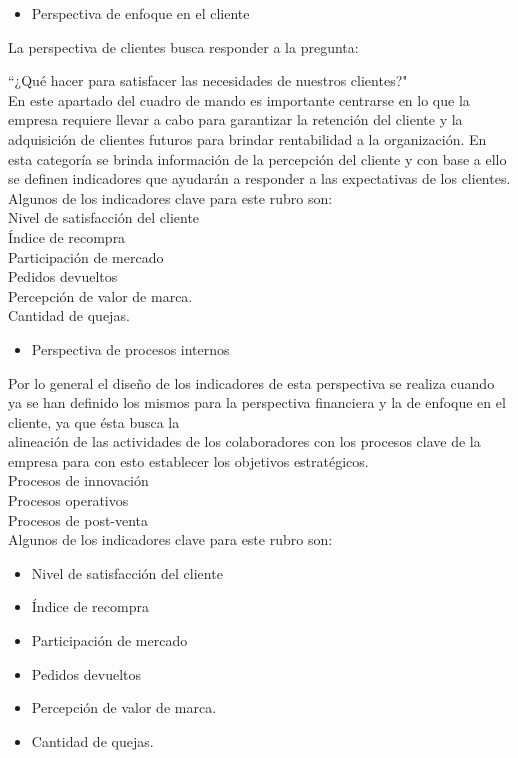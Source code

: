\documentclass[%
 reprint,
 amsmath,amssymb,
 aps,
]{revtex4-1}
\begin{document}
\begin{itemize}
\item Perspectiva de enfoque en el cliente
\end{itemize}

La perspectiva de clientes busca responder a la pregunta:

“¿Qué hacer para satisfacer las necesidades de nuestros clientes?"\\

En este apartado del cuadro de mando es importante centrarse en lo que la empresa requiere llevar a cabo para garantizar la retención del cliente y la adquisición de clientes futuros para brindar rentabilidad a la organización. En esta categoría se brinda información de la percepción del cliente y con base a ello se definen indicadores que ayudarán a responder a las expectativas de los clientes.\\

Algunos de los indicadores clave para este rubro son:\\

 Nivel de satisfacción del cliente\\
 Índice de recompra\\
 Participación de mercado\\
 Pedidos devueltos\\
 Percepción de valor de marca.\\
 Cantidad de quejas.\\
\begin{itemize}
\item Perspectiva de procesos internos
\end{itemize}
Por lo general el diseño de los indicadores de esta perspectiva se realiza cuando ya se han definido los mismos para la perspectiva financiera y la de enfoque en el cliente, ya que ésta busca la\\ alineación de las actividades de los colaboradores con los procesos clave de la empresa para con esto establecer los objetivos estratégicos. \\

 Procesos de innovación\\
 Procesos operativos\\
 Procesos de post-venta\\


Algunos de los indicadores clave para este rubro son:
\begin{itemize}
\item Nivel de satisfacción del cliente
\item Índice de recompra
\item Participación de mercado
\item Pedidos devueltos
\item Percepción de valor de marca.
\item Cantidad de quejas.
\end{itemize}
\end{document}
